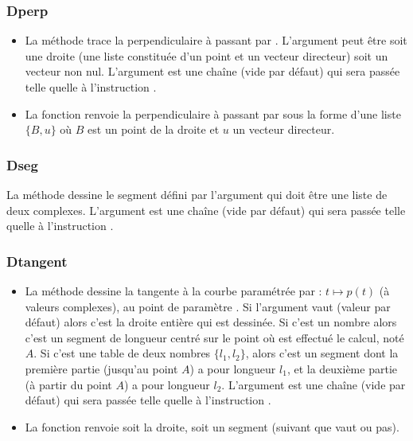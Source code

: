\subsubsection{Dperp}
\begin{itemize}
    \item La méthode  trace la perpendiculaire à  passant par . L'argument  peut être soit une droite (une liste constituée d'un point et un vecteur directeur) soit un vecteur non nul. L'argument  est une chaîne (vide par défaut) qui sera passée  telle quelle à l'instruction \drawcmd. \arguScale
    \item La fonction  renvoie la perpendiculaire à  passant par  sous la forme d'une liste $\{B,u\}$ où $B$ est un point de la droite et $u$ un vecteur directeur.
\end{itemize}

\subsubsection{Dseg}
La méthode  dessine le segment défini par l'argument  qui doit être une liste de deux complexes. L'argument  est une chaîne (vide par défaut) qui sera passée telle quelle à l'instruction \drawcmd. \arguScale

\newcommand*{\arguLong}{%
Si l'argument \argu{long} vaut \nil (valeur par défaut) alors c'est la droite entière qui est dessinée. Si c'est un nombre alors c'est un segment de longueur \argu{long} centré sur le point où est effectué le calcul, noté $A$. Si c'est une table de deux nombres $\{l_1,l_2\}$, alors c'est un segment dont la première partie (jusqu'au point $A$) a pour longueur $l_1$, et la deuxième partie (à partir du point $A$) a pour longueur $l_2$.
}%

\subsubsection{Dtangent}
\begin{itemize}
    \item La méthode  dessine la tangente à la courbe paramétrée par : \(t \mapsto p(t)\) (à valeurs complexes), au point de paramètre . \arguLong{} L'argument  est une chaîne (vide par défaut) qui sera passée telle quelle à l'instruction \drawcmd.
    \item La fonction  renvoie soit la droite, soit un segment (suivant que  vaut \nil ou pas).
\end{itemize}

